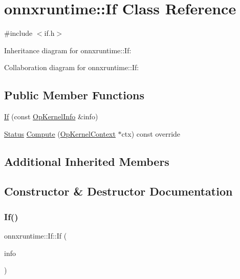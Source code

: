 \hypertarget{classonnxruntime_1_1If}{}\section{onnxruntime\+:\+:If Class Reference}
\label{classonnxruntime_1_1If}


{\ttfamily \#include $<$if.\+h$>$}



Inheritance diagram for onnxruntime\+:\+:If\+:


Collaboration diagram for onnxruntime\+:\+:If\+:
\subsection*{Public Member Functions}
\begin{DoxyCompactItemize}
\item 
\mbox{\hyperlink{classonnxruntime_1_1If_a2937f43cad4c1074b068b0f39f8f8566}{If}} (const \mbox{\hyperlink{classonnxruntime_1_1OpKernelInfo}{Op\+Kernel\+Info}} \&info)
\item 
\mbox{\hyperlink{classonnxruntime_1_1common_1_1Status}{Status}} \mbox{\hyperlink{classonnxruntime_1_1If_adbe75a2696664bc47d3ea2b88cb4bd63}{Compute}} (\mbox{\hyperlink{classonnxruntime_1_1OpKernelContext}{Op\+Kernel\+Context}} $\ast$ctx) const override
\end{DoxyCompactItemize}
\subsection*{Additional Inherited Members}


\subsection{Constructor \& Destructor Documentation}
\mbox{\label{classonnxruntime_1_1If_a2937f43cad4c1074b068b0f39f8f8566}} 
\subsubsection{\texorpdfstring{If()}{If()}}
{\footnotesize\ttfamily onnxruntime\+::\+If\+::\+If (\begin{DoxyParamCaption}\item[{const \mbox{\hyperlink{classonnxruntime_1_1OpKernelInfo}{Op\+Kernel\+Info}} \&}]{info }\end{DoxyParamCaption})\hspace{0.3cm}{\ttfamily [inline]}}




